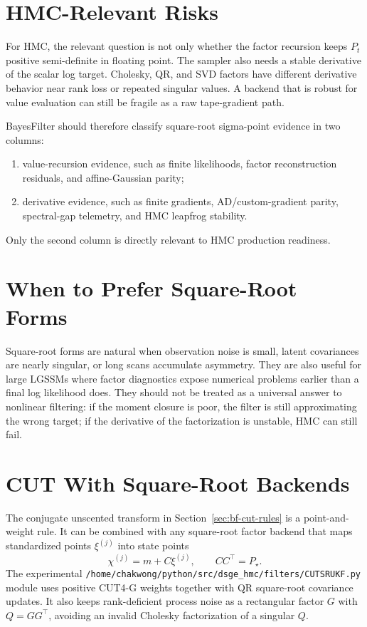 \section{HMC-Relevant Risks}
\label{sec:bf-square-root-hmc-risks}

For HMC, the relevant question is not only whether the factor recursion keeps
$P_t$ positive semi-definite in floating point.  The sampler also needs a
stable derivative of the scalar log target.  Cholesky, QR, and SVD factors have
different derivative behavior near rank loss or repeated singular values.  A
backend that is robust for value evaluation can still be fragile as a raw
tape-gradient path.

BayesFilter should therefore classify square-root sigma-point evidence in two
columns:
\begin{enumerate}[label=(\roman*)]
  \item value-recursion evidence, such as finite likelihoods, factor
    reconstruction residuals, and affine-Gaussian parity;
  \item derivative evidence, such as finite gradients, AD/custom-gradient
    parity, spectral-gap telemetry, and HMC leapfrog stability.
\end{enumerate}
Only the second column is directly relevant to HMC production readiness.

\section{When to Prefer Square-Root Forms}
\label{sec:bf-square-root-choice}

Square-root forms are natural when observation noise is small, latent
covariances are nearly singular, or long scans accumulate asymmetry.  They are
also useful for large LGSSMs where factor diagnostics expose numerical problems
earlier than a final log likelihood does.  They should not be treated as a
universal answer to nonlinear filtering: if the moment closure is poor, the
filter is still approximating the wrong target; if the derivative of the
factorization is unstable, HMC can still fail.

\section{CUT With Square-Root Backends}
\label{sec:bf-cut-square-root}

The conjugate unscented transform in Section~\ref{sec:bf-cut-rules} is a
point-and-weight rule.  It can be combined with any square-root factor backend
that maps standardized points $\xi^{(j)}$ into state points
\[
  \chi^{(j)}=m+C\xi^{(j)},\qquad CC^\top=P_\star .
\]
The experimental
\texttt{/home/chakwong/python/src/dsge\_hmc/filters/CUTSRUKF.py} module uses
positive CUT4-G weights together with QR square-root covariance updates.  It also
keeps rank-deficient process noise as a rectangular factor $G$ with
$Q=GG^\top$, avoiding an invalid Cholesky factorization of a singular $Q$.

